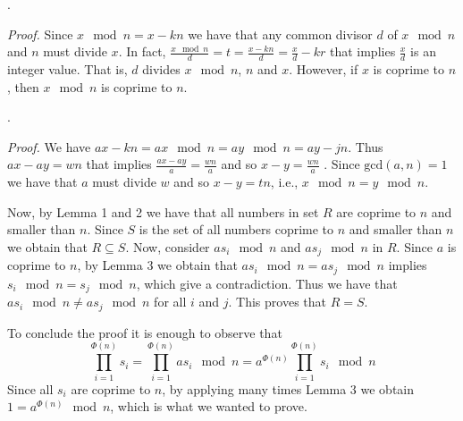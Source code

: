 .


\textit{Proof.} Since $x \mod n = x - kn$ we have that any common divisor $d$ of $x \mod n$ and $n$ must divide $x$. In fact, $\frac{x \mod n}{d} = t = \frac{x - kn}{d} = \frac{x}{d} - kr$ that implies $\frac{x}{d}$ is an integer value. That is, $d$ divides $x \mod n$, $n$ and $x$. However, if $x$ is coprime to $n$, then $x \mod n$ is coprime to $n$.

.


\textit{Proof.} We have $ax - kn = ax \mod n = ay \mod n = ay - jn$. Thus $ax - ay = wn$ that implies $\frac{ax - ay}{a} = \frac{wn}{a}$ and so $x-y = \frac{wn}{a}$ . Since $\text{gcd}(a,n)=1$ we have that $a$ must divide $w$ and so $x-y = tn$, i.e., $x \mod n = y \mod n$.



Now, by Lemma 1 and 2 we have that all numbers in set $R$ are coprime to $n$ and smaller than $n$. Since $S$ is the set of all numbers coprime to $n$ and smaller than $n$ we obtain that $R \subseteq S$. Now, consider $a s_i \mod n$ and $a s_j \mod n$ in $R$. Since $a$ is coprime to $n$, by Lemma 3 we obtain that $a s_i \mod n = a s_j \mod n$ implies $s_i \mod n = s_j \mod n$, which give a contradiction. Thus we have that $a s_i \mod n \neq a s_j \mod n$ for all $i$ and $j$. This proves that $R = S$.

To conclude the proof it is enough to observe that $$\prod_{i=1}^{\Phi(n)}{s_i} = \prod_{i=1}^{\Phi(n)}{a s_i \mod n} = a^{\Phi(n)}\prod_{i=1}^{\Phi(n)}{s_i \mod n}$$ Since all $s_i$ are coprime to $n$, by applying many times Lemma 3 we obtain $1 = a^{\Phi(n)} \mod n$, which is what we wanted to prove.

